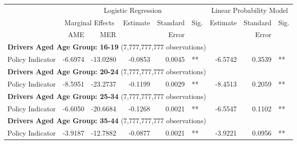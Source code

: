 
\begin{table}%
\centering 
\begin{tabular}{l r r r r l r r l} 

\hline 
 
 & \multicolumn{5}{c}{Logistic Regression}  & \multicolumn{3}{c}{Linear Probability Model} \\ 

 \cmidrule(lr){2-6}\cmidrule(lr){7-9} 
 & \multicolumn{2}{c}{Marginal Effects} & Estimate & Standard & Sig. & Estimate & Standard & Sig. \\ 
 &   AME &  MER  &          &  Error   &      &          &  Error   &     \\ 

\hline 
 
\multicolumn{8}{l}{\textbf{Drivers Aged Age Group: 16-19} (7,777,777,777 observations)} \\ 

Policy Indicator        &  -6.6974        &  -13.0280       &  -0.0853        &  0.0045       &   **       &  -6.5742        &  0.3539       &   **       \\ 

\hline 

\multicolumn{8}{l}{\textbf{Drivers Aged Age Group: 20-24} (7,777,777,777 observations)} \\ 

Policy Indicator        &  -8.5951        &  -23.2737       &  -0.1199        &  0.0029       &   **       &  -8.4513        &  0.2059       &   **       \\ 

\hline 

\multicolumn{8}{l}{\textbf{Drivers Aged Age Group: 25-34} (7,777,777,777 observations)} \\ 

Policy Indicator        &  -6.6050        &  -20.6684       &  -0.1268        &  0.0021       &   **       &  -6.5547        &  0.1102       &   **       \\ 

\hline 

\multicolumn{8}{l}{\textbf{Drivers Aged Age Group: 35-44} (7,777,777,777 observations)} \\ 

Policy Indicator        &  -3.9187        &  -12.7882       &  -0.0877        &  0.0021       &   **       &  -3.9221        &  0.0956       &   **       \\ 


\end{tabular}
\end{table}
